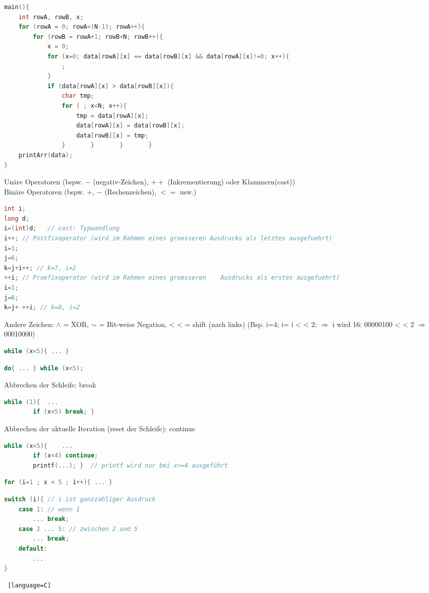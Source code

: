 \begin{multicols*}{3}
\begin{lstlisting}[language=C]
main(){	
	int rowA, rowB, x;
	for (rowA = 0; rowA<(N-1); rowA++){
		for (rowB = rowA+1; rowB<N; rowB++){
			x = 0;
			for (x=0; data[rowA][x] == data[rowB][x] && data[rowA][x]!=0; x++){
				;			
			}
			if (data[rowA][x] > data[rowB][x]){
				char tmp;
				for ( ; x<N; x++){
					tmp = data[rowA][x];
					data[rowA][x] = data[rowB][x];
					data[rowB][x] = tmp;
				}		}		}		}
	printArr(data);
}
\end{lstlisting}
\HRule[4pt]
Unäre Operatoren (bspw. $-$ (negativ-Zeichen), $++$ (Inkrementierung) oder Klammern(cast))\\
Binäre Operatoren (bspw. $+$, $-$ (Rechenzeichen), $<=$ usw.)
\begin{lstlisting}[language=C]
int i;
long d;
i=(int)d;	// cast: Typwandlung
i++; // Postfixoperator (wird im Rahmen eines groesseren Ausdrucks als letztes ausgefuehrt)
i=1;
j=6;
k=j+i++; // k=7, i=2
++i; // Praefixoperator (wird im Rahmen eines groesseren 	Ausdrucks als erstes ausgefuehrt)
i=1;
j=6;
k=j+ ++i; // k=8, i=2
\end{lstlisting}
Andere Zeichen: $\wedge$ = XOR, $\sim$ = Bit-weise Negation, <\! < = shift (nach links) (Bsp. i=4; i= i <\! < 2; $\Rightarrow$ i wird 16: 00000100 <\! < 2 $\Rightarrow$ 00010000)
\HRule[4pt]
\begin{lstlisting}[language=C]
	while (x<5){ ... }
\end{lstlisting}
\HDRule[4pt]
\begin{lstlisting}[language=C]
	do{	...	} while (x<5);
\end{lstlisting}
Abbrechen der Schleife: break
\begin{lstlisting}[language=C]
	while (1){	...
		if (x<5) break; }
\end{lstlisting}
Abbrechen der aktuelle Iteration (reset der Schleife): continue
\begin{lstlisting}[language=C]
	while (x<5){	...	
		if (x<4) continue;
		printf(...); }	// printf wird nur bei x>=4 ausgeführt
\end{lstlisting}
\HDRule[4pt]
\begin{lstlisting}[language=C]
	for (i=1 ; x < 5 ; i++){ ... }
\end{lstlisting}
\HDRule[4pt]
\begin{lstlisting}[language=C]
switch (i){ // i ist ganzzahliger Ausdruck
	case 1:	// wenn 1
		... break;
	case 2 ... 5: // zwischen 2 und 5
		... break;
	default:
		...
}
\end{lstlisting}
\HRule[4pt]
\begin{lstlisting} [language=C]

\end{lstlisting}
\end{multicols*}
